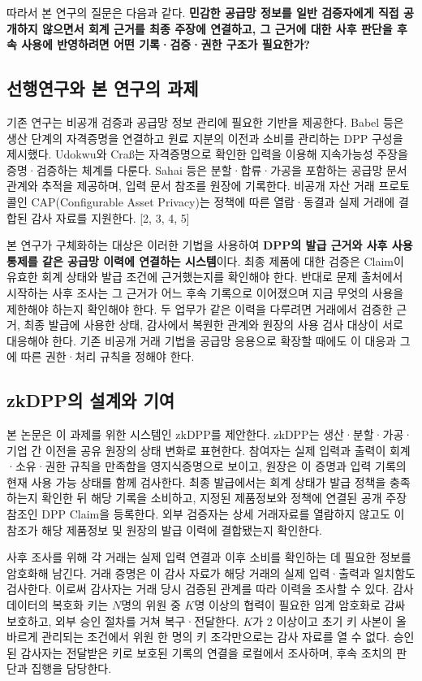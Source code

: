 \documentclass[11pt,a4paper]{article}
\begin{document}
따라서 본 연구의 질문은 다음과 같다.
\textbf{민감한 공급망 정보를 일반 검증자에게 직접 공개하지 않으면서 회계 근거를 최종 주장에 연결하고, 그 근거에 대한 사후 판단을 후속 사용에 반영하려면 어떤 기록·검증·권한 구조가 필요한가?}

\clearpage
\subsection{선행연구와 본 연구의 과제}
기존 연구는 비공개 검증과 공급망 정보 관리에 필요한 기반을 제공한다.
Babel 등은 생산 단계의 자격증명을 연결하고 원료 지분의 이전과 소비를 관리하는 DPP 구성을 제시했다.
Udokwu와 Craß는 자격증명으로 확인한 입력을 이용해 지속가능성 주장을 증명·검증하는 체계를 다룬다.
Sahai 등은 분할·합류·가공을 포함하는 공급망 문서 관계와 추적을 제공하며, 입력 문서 참조를 원장에 기록한다.
비공개 자산 거래 프로토콜인 CAP(Configurable Asset Privacy)는 정책에 따른 열람·동결과 실제 거래에 결합된 감사 자료를 지원한다. [2, 3, 4, 5]

본 연구가 구체화하는 대상은 이러한 기법을 사용하여 \textbf{DPP의 발급 근거와 사후 사용 통제를 같은 공급망 이력에 연결하는 시스템}이다.
최종 제품에 대한 검증은 Claim이 유효한 회계 상태와 발급 조건에 근거했는지를 확인해야 한다.
반대로 문제 출처에서 시작하는 사후 조사는 그 근거가 어느 후속 기록으로 이어졌으며 지금 무엇의 사용을 제한해야 하는지 확인해야 한다.
두 업무가 같은 이력을 다루려면 거래에서 검증한 근거, 최종 발급에 사용한 상태, 감사에서 복원한 관계와 원장의 사용 검사 대상이 서로 대응해야 한다.
기존 비공개 거래 기법을 공급망 응용으로 확장할 때에도 이 대응과 그에 따른 권한·처리 규칙을 정해야 한다.

\clearpage
\subsection{zkDPP의 설계와 기여}
본 논문은 이 과제를 위한 시스템인 zkDPP를 제안한다.
zkDPP는 생산·분할·가공·기업 간 이전을 공유 원장의 상태 변화로 표현한다.
참여자는 실제 입력과 출력이 회계·소유·권한 규칙을 만족함을 영지식증명으로 보이고, 원장은 이 증명과 입력 기록의 현재 사용 가능 상태를 함께 검사한다.
최종 발급에서는 회계 상태가 발급 정책을 충족하는지 확인한 뒤 해당 기록을 소비하고, 지정된 제품정보와 정책에 연결된 공개 주장 참조인 DPP Claim을 등록한다.
외부 검증자는 상세 거래자료를 열람하지 않고도 이 참조가 해당 제품정보 및 원장의 발급 이력에 결합됐는지 확인한다.

사후 조사를 위해 각 거래는 실제 입력 연결과 이후 소비를 확인하는 데 필요한 정보를 암호화해 남긴다.
거래 증명은 이 감사 자료가 해당 거래의 실제 입력·출력과 일치함도 검사한다.
이로써 감사자는 거래 당시 검증된 관계를 따라 이력을 조사할 수 있다.
감사 데이터의 복호화 키는 $N$명의 위원 중 $K$명 이상의 협력이 필요한 임계 암호화로 감싸 보호하고, 외부 승인 절차를 거쳐 복구·전달한다.
$K$가 2 이상이고 초기 키 사본이 올바르게 관리되는 조건에서 위원 한 명의 키 조각만으로는 감사 자료를 열 수 없다.
승인된 감사자는 전달받은 키로 보호된 기록의 연결을 로컬에서 조사하며, 후속 조치의 판단과 집행을 담당한다.
\end{document}
